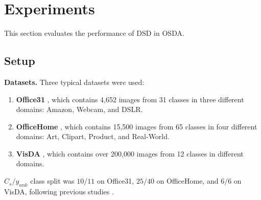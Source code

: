 \documentclass[10pt,twocolumn,letterpaper]{article}
\begin{document}
\section{Experiments}

This section evaluates the performance of DSD in OSDA.

\subsection{Setup}

\textbf{Datasets.} Three typical datasets were used:
\begin{enumerate}
\item \textbf{Office31} \cite{saenko2010adapting}, which contains 4,652 images from 31 classes in three different domains: Amazon, Webcam, and DSLR.
\item \textbf{OfficeHome} \cite{venkateswara2017deep}, which contains 15,500 images from 65 classes in four different domains: Art, Clipart, Product, and Real-World.
\item \textbf{VisDA} \cite{visda2017}, which contains over 200,000 images from 12 classes in different domains.
\end{enumerate}
$C_s/y_{unk}$ class split was $10/11$ on Office31, $25/40$ on OfficeHome, and $6/6$ on VisDA, following previous studies \cite{jang2022unknown, sanqing2023GLC}.
\end{document}
